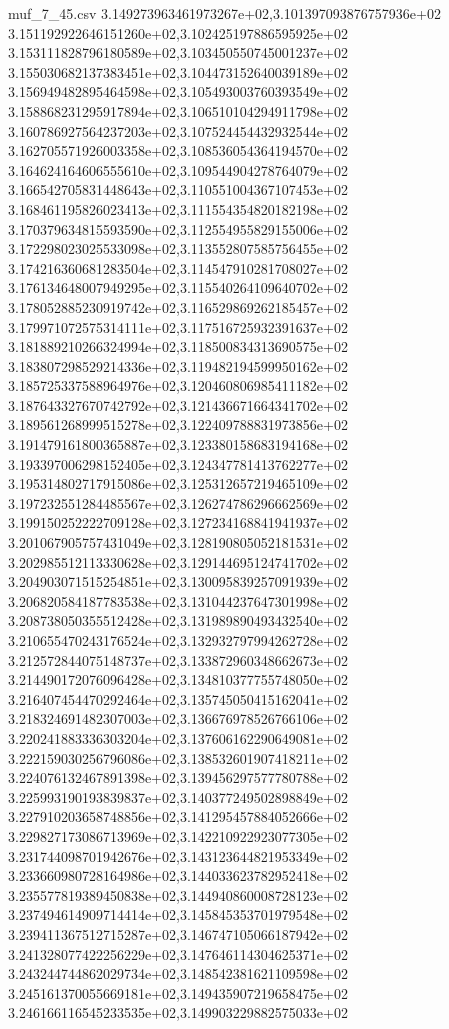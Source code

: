 \begin{filecontents*}{muf_7_45.csv}
3.149273963461973267e+02,3.101397093876757936e+02
3.151192922646151260e+02,3.102425197886595925e+02
3.153111828796180589e+02,3.103450550745001237e+02
3.155030682137383451e+02,3.104473152640039189e+02
3.156949482895464598e+02,3.105493003760393549e+02
3.158868231295917894e+02,3.106510104294911798e+02
3.160786927564237203e+02,3.107524454432932544e+02
3.162705571926003358e+02,3.108536054364194570e+02
3.164624164606555610e+02,3.109544904278764079e+02
3.166542705831448643e+02,3.110551004367107453e+02
3.168461195826023413e+02,3.111554354820182198e+02
3.170379634815593590e+02,3.112554955829155006e+02
3.172298023025533098e+02,3.113552807585756455e+02
3.174216360681283504e+02,3.114547910281708027e+02
3.176134648007949295e+02,3.115540264109640702e+02
3.178052885230919742e+02,3.116529869262185457e+02
3.179971072575314111e+02,3.117516725932391637e+02
3.181889210266324994e+02,3.118500834313690575e+02
3.183807298529214336e+02,3.119482194599950162e+02
3.185725337588964976e+02,3.120460806985411182e+02
3.187643327670742792e+02,3.121436671664341702e+02
3.189561268999515278e+02,3.122409788831973856e+02
3.191479161800365887e+02,3.123380158683194168e+02
3.193397006298152405e+02,3.124347781413762277e+02
3.195314802717915086e+02,3.125312657219465109e+02
3.197232551284485567e+02,3.126274786296662569e+02
3.199150252222709128e+02,3.127234168841941937e+02
3.201067905757431049e+02,3.128190805052181531e+02
3.202985512113330628e+02,3.129144695124741702e+02
3.204903071515254851e+02,3.130095839257091939e+02
3.206820584187783538e+02,3.131044237647301998e+02
3.208738050355512428e+02,3.131989890493432540e+02
3.210655470243176524e+02,3.132932797994262728e+02
3.212572844075148737e+02,3.133872960348662673e+02
3.214490172076096428e+02,3.134810377755748050e+02
3.216407454470292464e+02,3.135745050415162041e+02
3.218324691482307003e+02,3.136676978526766106e+02
3.220241883336303204e+02,3.137606162290649081e+02
3.222159030256796086e+02,3.138532601907418211e+02
3.224076132467891398e+02,3.139456297577780788e+02
3.225993190193839837e+02,3.140377249502898849e+02
3.227910203658748856e+02,3.141295457884052666e+02
3.229827173086713969e+02,3.142210922923077305e+02
3.231744098701942676e+02,3.143123644821953349e+02
3.233660980728164986e+02,3.144033623782952418e+02
3.235577819389450838e+02,3.144940860008728123e+02
3.237494614909714414e+02,3.145845353701979548e+02
3.239411367512715287e+02,3.146747105066187942e+02
3.241328077422256229e+02,3.147646114304625371e+02
3.243244744862029734e+02,3.148542381621109598e+02
3.245161370055669181e+02,3.149435907219658475e+02
3.246166116545233535e+02,3.149903229882575033e+02

\end{filecontents*}
